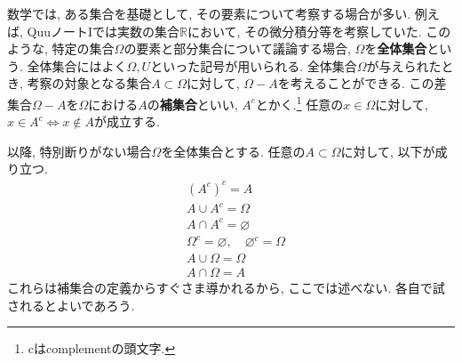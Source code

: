 \documentclass[a4j,dvipdfmx]{jsarticle}
\numberwithin{equation}{section}
\begin{document}
            数学では, ある集合を基礎として, その要素について考察する場合が多い. 例えば, QuuノートIでは実数の集合$\mathbb{R}$において, その微分積分等を考察していた.
            このような, 特定の集合$\Omega$の要素と部分集合について議論する場合, $\varOmega$を\textbf{全体集合}という. 全体集合にはよく$\varOmega,U$といった記号が用いられる.
            全体集合$\varOmega$が与えられたとき, 考察の対象となる集合$A\subset \varOmega$に対して, $\varOmega - A$を考えることができる. 
            この差集合$\varOmega - A$を$\varOmega$における$A$の\textbf{補集合}といい, $A^c$とかく.\footnote{cはcomplementの頭文字.}
            任意の$x\in \varOmega$に対して, $x\in A^c \Leftrightarrow x\not\in A$が成立する.

            以降, 特別断りがない場合$\varOmega$を全体集合とする. 任意の$A\subset \varOmega$に対して, 以下が成り立つ.
            \begin{align}
                &(A^c)^c = A\\
                &A\cup A^c = \varOmega\\
                &A\cap A^c = \varnothing\\
                &\varOmega^c = \varnothing,\quad \varnothing^c = \Omega\\
                &A\cup \varOmega=\varOmega\\
                &A\cap\varOmega=A
            \end{align}
            これらは補集合の定義からすぐさま導かれるから, ここでは述べない. 各自で試されるとよいであろう.
\end{document}
